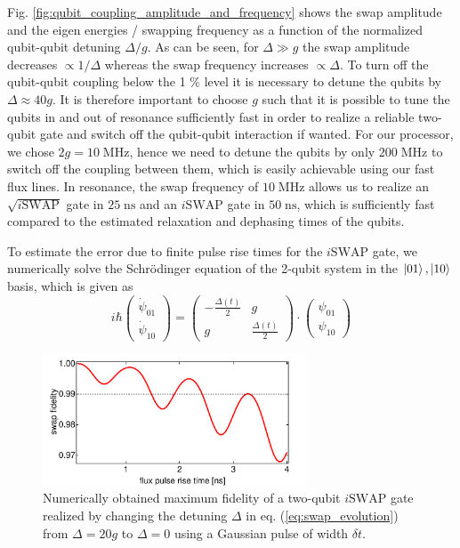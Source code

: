 Fig. \ref{fig:qubit_coupling_amplitude_and_frequency} shows the swap amplitude and the eigen energies / swapping frequency as a function of the normalized qubit-qubit detuning $\Delta/g$. As can be seen, for $\Delta \gg g$ the swap amplitude decreases $\propto 1/\Delta$ whereas the swap frequency increases $\propto \Delta$. To turn off the qubit-qubit coupling below the 1 \% level it is necessary to detune the qubits by $\Delta \approx 40 g$. It is therefore important to choose $g$ such that it is possible to tune the qubits in and out of resonance sufficiently fast in order to realize a reliable two-qubit gate and switch off the qubit-qubit interaction if wanted. For our processor, we chose $2g = 10\;\mathrm{MHz}$, hence we need to detune the qubits by only $200\;\mathrm{MHz}$ to switch off the coupling between them, which is easily achievable using our fast flux lines. In resonance, the swap frequency of $10\;\mathrm{MHz}$ allows us to realize an $\sqrt{i\mathrm{SWAP}}$ gate in $25\;\mathrm{ns}$ and an $i\mathrm{SWAP}$ gate in $50\;\mathrm{ns}$, which is sufficiently fast compared to the estimated relaxation and dephasing times of the qubits.

\smallskip

To estimate the error due to finite pulse rise times for the $i\mathrm{SWAP}$ gate, we numerically solve the Schrödinger equation of the 2-qubit system in the $\left| 01 \right>,\left| 10 \right>$ basis, which is given as
%
\begin{equation}
i\hbar\left(\begin{array}{c} \dot{\psi}_{01} \\ \dot{\psi}_{10} \end{array}\right) = \left( \begin{array}{cc} -\frac{\Delta(t)}{2} & g \\ g & \frac{\Delta(t)}{2}  \end{array} \right)\cdot \left(\begin{array}{c} \psi_{01} \\ \psi_{10} \end{array}\right) \label{eq:swap_evolution}
\end{equation}
%

\begin{figure}
	\centering
	\includegraphics[width=0.7\textwidth]{./material/mathematica/qubit_qubit_swap_error}
	\caption[]{Numerically obtained maximum fidelity of a two-qubit $i\mathrm{SWAP}$ gate realized by changing the detuning $\Delta$ in eq. (\ref{eq:swap_evolution}) from $\Delta = 20g$ to $\Delta=0$ using a Gaussian pulse of width $\delta t$.}
	\label{fig:qubit_qubit_coupling_swap_error}
\end{figure}

